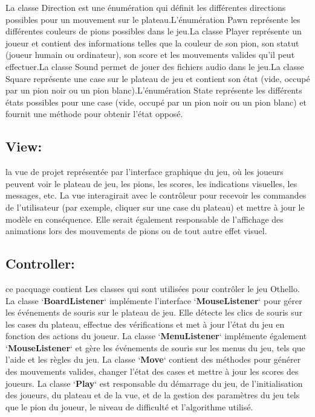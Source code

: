 \documentclass[12pt]{article}
\begin{document}
La classe Direction est une énumération qui définit les différentes directions possibles pour un mouvement sur le plateau.L'énumération Pawn représente les différentes couleurs de pions possibles dans le jeu.La classe Player représente un joueur et contient des informations telles que la couleur de son pion, son statut (joueur humain ou ordinateur), son score et les mouvements valides qu'il peut effectuer.La classe Sound permet de jouer des fichiers audio dans le jeu.La classe Square représente une case sur le plateau de jeu et contient son état (vide, occupé par un pion noir ou un pion blanc).L'énumération State représente les différents états possibles pour une case (vide, occupé par un pion noir ou un pion blanc) et fournit une méthode pour obtenir l'état opposé.

\subsection{View:} la vue de projet représentée par l'interface graphique du jeu, où les joueurs peuvent voir le plateau de jeu, les pions, les scores, les indications visuelles, les messages, etc. La vue interagirait avec le contrôleur pour recevoir les commandes de l'utilisateur (par exemple, cliquer sur une case du plateau) et mettre à jour le modèle en conséquence. Elle serait également responsable de l'affichage des animations lors des mouvements de pions ou de tout autre effet visuel.

\subsection{Controller:}ce pacquage contient Les classes qui sont utilisées pour contrôler le jeu Othello. La classe `\textbf{BoardListener}` implémente l'interface `\textbf{MouseListener}` pour gérer les événements de souris sur le plateau de jeu. Elle détecte les clics de souris sur les cases du plateau, effectue des vérifications et met à jour l'état du jeu en fonction des actions du joueur. La classe `\textbf{MenuListener}` implémente également `\textbf{MouseListener}` et gère les événements de souris sur les menus du jeu, tels que l'aide et les règles du jeu. La classe `\textbf{Move}` contient des méthodes pour générer des mouvements valides, changer l'état des cases et mettre à jour les scores des joueurs. La classe `\textbf{Play}` est responsable du démarrage du jeu, de l'initialisation des joueurs, du plateau et de la vue, et de la gestion des paramètres du jeu tels que le pion du joueur, le niveau de difficulté et l'algorithme utilisé.
\end{document}
